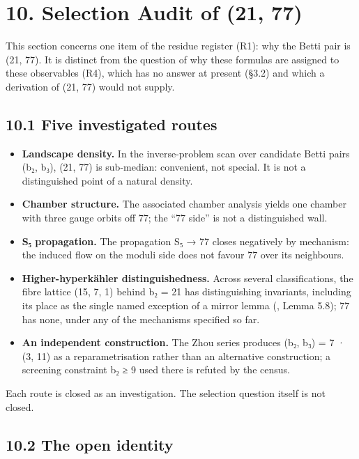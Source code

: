 \documentclass[11pt,a4paper]{article}
\begin{document}
\section{10. Selection Audit of (21, 77)}\label{selection-audit-of-21-77}

This section concerns one item of the residue register (R1): why the Betti pair is (21, 77). It is distinct from the question of why these formulas are assigned to these observables (R4), which has no answer at present (§3.2) and which a derivation of (21, 77) would not supply.

\subsection{10.1 Five investigated routes}\label{five-investigated-routes}

\begin{itemize}
\tightlist
\item
  \textbf{Landscape density.} In the inverse-problem scan over candidate Betti pairs (b₂, b₃), (21, 77) is sub-median: convenient, not special. It is not a distinguished point of a natural density.
\item
  \textbf{Chamber structure.} The associated chamber analysis yields one chamber with three gauge orbits off 77; the ``77 side'' is not a distinguished wall.
\item
  \textbf{S₅ propagation.} The propagation S₅ → 77 closes negatively by mechanism: the induced flow on the moduli side does not favour 77 over its neighbours.
\item
  \textbf{Higher-hyperkähler distinguishedness.} Across several classifications, the fibre lattice (15, 7, 1) behind b₂ = 21 has distinguishing invariants, including its place as the single named exception of a mirror lemma (\cite{54}, Lemma 5.8); 77 has none, under any of the mechanisms specified so far.
\item
  \textbf{An independent construction.} The Zhou series \cite{55} produces (b₂, b₃) = 7 · (3, 11) as a reparametrisation rather than an alternative construction; a screening constraint b₂ ≥ 9 used there is refuted by the census.
\end{itemize}

Each route is closed as an investigation. The selection question itself is not closed.

\subsection{10.2 The open identity}\label{the-open-identity}
\end{document}
